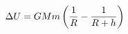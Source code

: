 \documentclass[preview]{standalone}
\begin{document}
\begin{align*}
\special{dvisvgm:raw <g id='unique000'>}\Delta U = GMm \left( \frac{1}{R} - \frac{1}{R+h} \right)\special{dvisvgm:raw </g>}
\end{align*}
\end{document}
